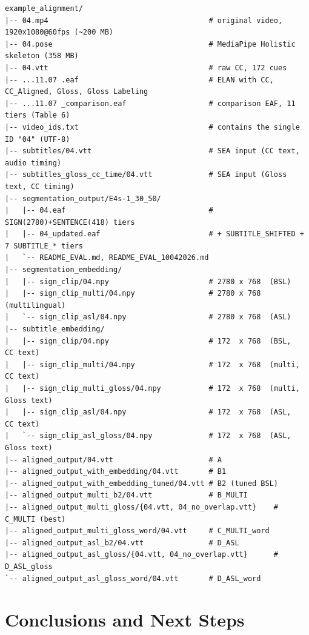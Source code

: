 \documentclass[11pt,a4paper]{article}
\begin{document}
\begin{lstlisting}[basicstyle=\ttfamily\scriptsize]
example_alignment/
|-- 04.mp4                                     # original video, 1920x1080@60fps (~200 MB)
|-- 04.pose                                    # MediaPipe Holistic skeleton (358 MB)
|-- 04.vtt                                     # raw CC, 172 cues
|-- ...11.07 .eaf                              # ELAN with CC, CC_Aligned, Gloss, Gloss Labeling
|-- ...11.07 _comparison.eaf                   # comparison EAF, 11 tiers (Table 6)
|-- video_ids.txt                              # contains the single ID "04" (UTF-8)
|-- subtitles/04.vtt                           # SEA input (CC text, audio timing)
|-- subtitles_gloss_cc_time/04.vtt             # SEA input (Gloss text, CC timing)
|-- segmentation_output/E4s-1_30_50/
|   |-- 04.eaf                                 # SIGN(2780)+SENTENCE(418) tiers
|   |-- 04_updated.eaf                         # + SUBTITLE_SHIFTED + 7 SUBTITLE_* tiers
|   `-- README_EVAL.md, README_EVAL_10042026.md
|-- segmentation_embedding/
|   |-- sign_clip/04.npy                       # 2780 x 768  (BSL)
|   |-- sign_clip_multi/04.npy                 # 2780 x 768  (multilingual)
|   `-- sign_clip_asl/04.npy                   # 2780 x 768  (ASL)
|-- subtitle_embedding/
|   |-- sign_clip/04.npy                       # 172  x 768  (BSL,    CC text)
|   |-- sign_clip_multi/04.npy                 # 172  x 768  (multi,  CC text)
|   |-- sign_clip_multi_gloss/04.npy           # 172  x 768  (multi,  Gloss text)
|   |-- sign_clip_asl/04.npy                   # 172  x 768  (ASL,    CC text)
|   `-- sign_clip_asl_gloss/04.npy             # 172  x 768  (ASL,    Gloss text)
|-- aligned_output/04.vtt                      # A
|-- aligned_output_with_embedding/04.vtt       # B1
|-- aligned_output_with_embedding_tuned/04.vtt # B2 (tuned BSL)
|-- aligned_output_multi_b2/04.vtt             # B_MULTI
|-- aligned_output_multi_gloss/{04.vtt, 04_no_overlap.vtt}    # C_MULTI (best)
|-- aligned_output_multi_gloss_word/04.vtt     # C_MULTI_word
|-- aligned_output_asl_b2/04.vtt               # D_ASL
|-- aligned_output_asl_gloss/{04.vtt, 04_no_overlap.vtt}      # D_ASL_gloss
`-- aligned_output_asl_gloss_word/04.vtt       # D_ASL_word
\end{lstlisting}

\section{Conclusions and Next Steps}
\end{document}
